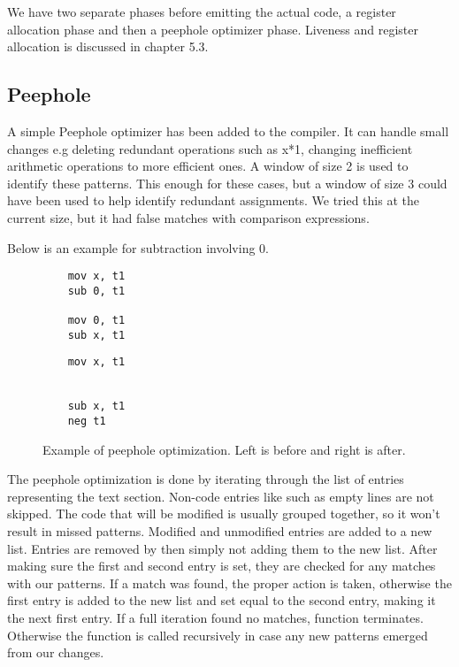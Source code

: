 \documentclass{article}
\begin{document}
We have two separate phases before emitting the actual code, a register allocation phase and then a peephole optimizer phase. Liveness and register allocation is discussed in chapter 5.3. 


\subsection{Peephole}
A simple Peephole optimizer has been added to the compiler. It can handle small changes e.g deleting redundant operations such as x*1, changing inefficient arithmetic operations to more efficient ones. 
A window of size 2 is used to identify these patterns. This enough for these cases, but a window of size 3 could have been used to help identify redundant assignments. We tried this at the current size, but it had false matches with comparison expressions. 

Below is an example for subtraction involving 0.
\begin{figure}[h]
    \centering
    \begin{minipage}[t]{0.45\textwidth}
        \centering
        \begin{lstlisting}             
    mov x, t1
    sub 0, t1
    
    mov 0, t1
    sub x, t1
        \end{lstlisting}
    \end{minipage}
    \hfill
    \begin{minipage}[t]{0.45\textwidth}
        \centering
        \begin{lstlisting}            
    mov x, t1
    
    
    sub x, t1
    neg t1
        \end{lstlisting}             
    \end{minipage} 
    \hfill
    \begin{minipage}[t]{0.9\textwidth}
        \centering
    \end{minipage}
        \caption{Example of peephole optimization. Left is before and right is after. }
\end{figure}

The peephole optimization is done by iterating through the list of entries representing the text section. Non-code entries like such as empty lines are not skipped. The code that will be modified is usually grouped together, so it won't result in missed patterns. Modified and unmodified entries are added to a new list. Entries are removed by then simply not adding them to the new list. After making sure the first and second entry is set, they are checked for any matches with our patterns. If a match was found, the proper action is taken, otherwise the first entry is added to the new list and set equal to the second entry, making it the next first entry. If a full iteration found no matches, function terminates. Otherwise the function is called recursively in case any new patterns emerged from our changes.
\end{document}

